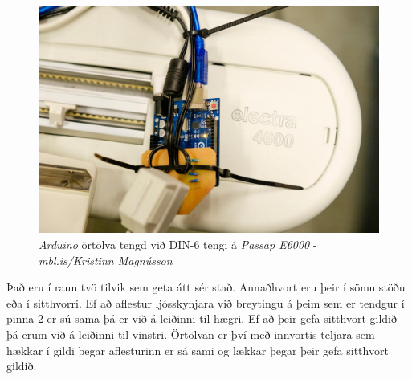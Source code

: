 \begin{figure}[b]
    \centering
    \includegraphics[width=0.5\linewidth]{myndir/elli/electra4600.jpg}
    \caption{\textit{Arduino} örtölva tengd við DIN-6 tengi á \textit{Passap E6000} - \textit{mbl.is/Kristinn Magnússon}}
    \label{fig:arduino}
\end{figure}
Það eru í raun tvö tilvik sem geta átt sér stað. Annaðhvort eru þeir í sömu stöðu eða í sitthvorri. Ef að aflestur ljósskynjara við breytingu á þeim sem er tendgur í pinna 2 er sú sama þá er við á leiðinni til hægri. Ef að þeir gefa sitthvort gildið þá erum við á leiðinni til vinstri. Örtölvan er því með innvortis teljara sem hækkar í gildi þegar aflesturinn er sá sami og lækkar þegar þeir gefa sitthvort gildið.
